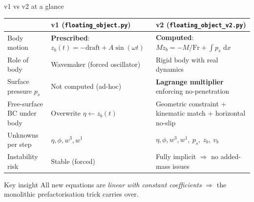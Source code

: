 \documentclass[aspectratio=169, 10pt]{beamer}
\newcommand{\Fr}{\mathrm{Fr}}
\newcommand{\dd}{\,\mathrm{d}}
\begin{document}
\begin{frame}{v1 vs v2 at a glance}
\begin{center}
\renewcommand{\arraystretch}{1.25}
\small
\begin{tabular}{@{}p{}p{}p{}@{}}
\toprule
 & \textbf{v1 (\texttt{floating\_object.py})} & \textbf{v2 (\texttt{floating\_object\_v2.py})} \\
\midrule
Body motion & \textbf{Prescribed}: $z_b(t)=-\mathrm{draft}+A\sin(\omega t)$ & \textbf{Computed}: $M\ddot z_b = -M/\Fr + \int p_s\,\dd x$ \\
Role of body & Wavemaker (forced oscillator) & Rigid body with real dynamics \\
Surface pressure $p_s$ & Not computed (ad-hoc) & \textbf{Lagrange multiplier} enforcing no-penetration \\
Free-surface BC under body & Overwrite $\eta \leftarrow z_b(t)$ & Geometric constraint + kinematic match + horizontal no-slip \\
Unknowns per step & $\eta,\phi,w^3,w^1$ & $\eta,\phi,w^3,w^1,\ p_s,\ z_b,\ v_b$ \\
Instability risk & Stable (forced) & Fully implicit $\Rightarrow$ no added-mass issues \\
\bottomrule
\end{tabular}
\end{center}

\vspace{0.5em}
\begin{block}{Key insight}
All new equations are \emph{linear with constant coefficients} $\Rightarrow$ the monolithic prefactorisation trick carries over.
\end{block}
\end{frame}

\end{document}
